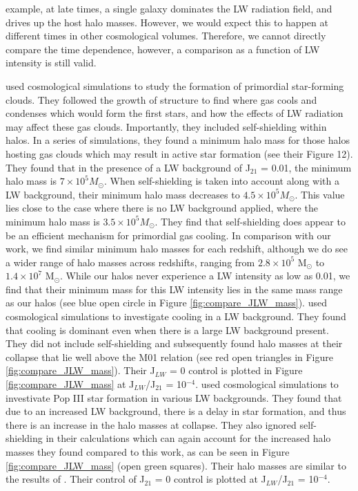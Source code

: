 \documentclass[a4paper,fleqn,usenatbib]{mnras}
\begin{document}
example, at late times, a single galaxy dominates the LW radiation field, and drives up the host halo masses. However, we would expect this to happen at different times in other cosmological volumes. Therefore, we cannot directly compare the time dependence, however, a comparison as a function of LW intensity is still valid. 

\citet{Yoshida03} used cosmological simulations to study the formation of primordial star-forming clouds. They followed the growth of structure to find where gas cools and condenses which would form the first stars, and how the effects of LW radiation may affect these gas clouds. Importantly, they included \hh{} self-shielding within halos. In a series of simulations, they found a minimum halo mass for those halos hosting gas clouds which may result in active star formation (see their Figure 12). They found that in the presence of a LW background of J$_{21}$ = 0.01, the minimum halo mass is $7 \times 10^{5} M_{\odot}$. When \hh{} self-shielding is taken into account along with a LW background, their minimum halo mass decreases to $4.5 \times 10^{5} M_{\odot}$. This value lies close to the case where there is no LW background applied, where the minimum halo mass is $3.5 \times 10^{5} M_{\odot}$. They find that \hh{} self-shielding does appear to be an efficient mechanism for primordial gas cooling. In comparison with our work, we find similar minimum halo masses for each redshift, although we do see a wider range of halo masses across redshifts, ranging from $2.8 \times 10^{5}$ M$_{\odot}$ to $1.4 \times 10^{7}$ M$_{\odot}$. While our halos never experience a LW intensity as low as 0.01, we find that their minimum mass for this LW intensity lies in the same mass range as our halos (see blue open circle in Figure \ref{fig:compare_JLW_mass}). \citet{Wise07_UVB} used cosmological simulations to investigate \hh{} cooling in a LW background. They found that \hh{} cooling is dominant even when there is a large LW background present. They did not include self-shielding and subsequently found halo masses at their collapse that lie well above the M01 relation (see red open triangles in Figure \ref{fig:compare_JLW_mass}). Their J$_{LW}$ = 0 control is plotted in Figure \ref{fig:compare_JLW_mass} at J$_{LW}$/J$_{21}$ = 10$^{-4}$. \citet{OShea08} used cosmological simulations to investivate Pop III star formation in various LW backgrounds. They found that due to an increased LW background, there is a delay in star formation, and thus there is an increase in the halo masses at collapse. They also ignored \hh{} self-shielding in their calculations which can again account for the increased halo masses they found compared to this work, as can be seen in Figure \ref{fig:compare_JLW_mass} (open green squares). Their halo masses are similar to the results of \citet{Wise07_UVB}. Their control of J$_{21}$ = 0 control is plotted at J$_{LW}$/J$_{21}$ = 10$^{-4}$.
\end{document}
